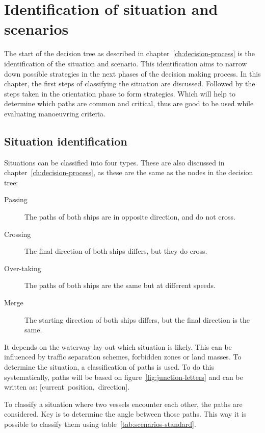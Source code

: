 \chapter{Identification of situation and scenarios}
\label{ch:identify-situation}
The start of the decision tree as described in chapter~\ref{ch:decision-process} is the identification of the situation and scenario. This identification aims to narrow down possible strategies in the next phases of the decision making process. In this chapter, the first steps of classifying the situation are discussed. Followed by the steps taken in the orientation phase to form strategies. Which will help to determine which paths are common and critical, thus are good to be used while evaluating manoeuvring criteria.

\section{Situation identification}
\label{sec:situation-identification}
Situations can be classified into four types. These are also discussed in chapter~\ref{ch:decision-process}, as these are the same as the nodes in the decision tree:
\begin{description}
	\item [Passing] The paths of both ships are in opposite direction, and do not cross.
	\item [Crossing]The final direction of both ships differs, but they do cross.
	\item [Over-taking] The paths of both ships are the same but at different speeds.
	\item [Merge] The starting direction of both ships differs, but the final direction is the same.
\end{description}
It depends on the waterway lay-out which situation is likely. This can be influenced by traffic separation schemes, forbidden zones or land masses. To determine the situation, a classification of paths is used. To do this systematically, paths will be based on figure~\ref{fig:junction-letters} and can be written as: [current~position,~direction].

To classify a situation where two vessels encounter each other, the paths are considered. Key is to determine the angle between those paths. This way it is possible to classify them using table~\ref{tab:scenarios-standard}.


